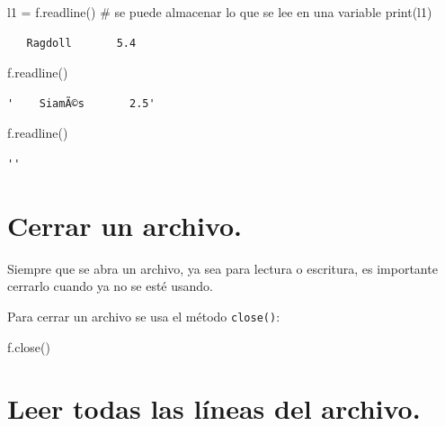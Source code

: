 \documentclass[
  spanish,
  letterpaper,
]{scrbook}
\newenvironment{Shaded}{\begin{snugshade}}{\end{snugshade}}
\newcommand{\BuiltInTok}[1]{\textcolor[rgb]{0.00,0.23,0.31}{#1}}
\newcommand{\CommentTok}[1]{\textcolor[rgb]{0.37,0.37,0.37}{#1}}
\newcommand{\NormalTok}[1]{\textcolor[rgb]{0.00,0.23,0.31}{#1}}
\newcommand{\OperatorTok}[1]{\textcolor[rgb]{0.37,0.37,0.37}{#1}}
\theoremstyle{definition}
\theoremstyle{remark}
\begin{document}
\begin{Shaded}
\begin{Highlighting}[]
\NormalTok{l1 }\OperatorTok{=}\NormalTok{ f.readline() }\CommentTok{\# se puede almacenar lo que se lee en una variable}
\BuiltInTok{print}\NormalTok{(l1)}
\end{Highlighting}
\end{Shaded}

\begin{verbatim}
   Ragdoll       5.4
\end{verbatim}

\begin{Shaded}
\begin{Highlighting}[]
\NormalTok{f.readline()}
\end{Highlighting}
\end{Shaded}

\begin{verbatim}
'    SiamÃ©s       2.5'
\end{verbatim}

\begin{Shaded}
\begin{Highlighting}[]
\NormalTok{f.readline()}
\end{Highlighting}
\end{Shaded}

\begin{verbatim}
''
\end{verbatim}

\section{Cerrar un archivo.}\label{cerrar-un-archivo.}

Siempre que se abra un archivo, ya sea para lectura o escritura, es
importante cerrarlo cuando ya no se esté usando.

Para cerrar un archivo se usa el método \texttt{close()}:

\begin{Shaded}
\begin{Highlighting}[]
\NormalTok{f.close()}
\end{Highlighting}
\end{Shaded}

\section{Leer todas las líneas del
archivo.}\label{leer-todas-las-luxedneas-del-archivo.}
\end{document}
